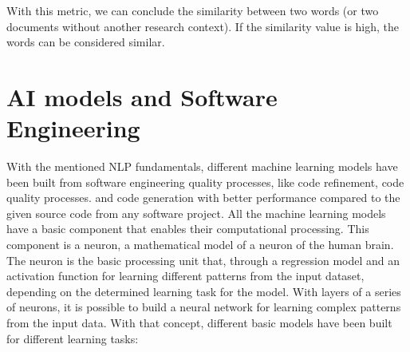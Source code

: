 With this metric, we can conclude the similarity between two words (or two documents without another research context). If the similarity value is high, the words can be considered similar.

\section{AI models and Software Engineering}
With the mentioned NLP fundamentals, different machine learning models have been built from software engineering quality processes, like code refinement, code quality processes. and code generation with better performance compared to the given source code from any software project. All the machine learning models have a basic component that enables their computational processing. This component is a neuron, a mathematical model of a neuron of the human brain. The neuron is the basic processing unit that, through a regression model and an activation function for learning different patterns from the input dataset, depending on the determined learning task for the model. With layers of a series of neurons, it is possible to build a neural network for learning complex patterns from the input data.
With that concept, different basic models have been built for different learning tasks:

